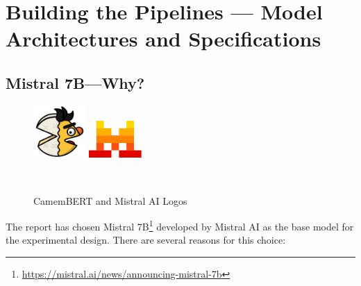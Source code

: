 \documentclass[12pt]{article}
\begin{document}

\section{Building the Pipelines --- Model Architectures and Specifications}
\subsection{Mistral 7B\;---\;Why?}

\begin{figure}
  \vspace{-30pt}
  \begin{minipage}{0.49\linewidth}
    \centering
    \includegraphics[width=2cm]{figures/CamemBERT.png}
  \end{minipage}%
  \hfill
  \begin{minipage}{0.49\linewidth}
    \centering
    \includegraphics[width=2cm]{figures/mistral-logo.png}
  \end{minipage}\\[3pt]
  {\captionsetup{font=scriptsize,skip=0pt}\caption*{CamemBERT and Mistral AI Logos}}
\end{figure}
The report has chosen Mistral 7B\footnote{\url{https://mistral.ai/news/announcing-mistral-7b}} developed by Mistral AI as the base model for the experimental design\cite{jiang2023mistral7b}. There are several reasons for this choice:
\end{document}
